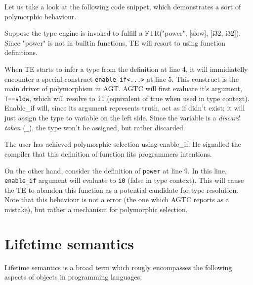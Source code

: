 \documentclass[times, utf8, diplomski]{fer}
\theoremstyle{definition}
\newcommand{\textcode}[3]{
    
}
\begin{document}
Let us take a look at the following code snippet, which demonstrates a sort of polymorphic behaviour.

\textcode{\resdir/compiler/inf1.agt}{}{a}

Suppose the type engine is invoked to fulfill a FTR("power", [slow], [i32, i32]).
Since "power" is not in builtin functions, TE will resort to using function definitions.

When TE starts to infer a type from the definition at line 4, it will immidiatelly encounter a special
construct \texttt{enable\_if<...>} at line 5. This construct is the main driver of polymorphism in AGT.
AGTC will first evaluate it's argument, \texttt{T==slow}, which will resolve to \texttt{i1} (equivalent of
true when used in type context). Enable\_if will, since its argument represents truth, act as if didn't exist;
it will just assign the type to variable on the left side. Since the variable is a \textit{discard token}
(\texttt{\_}), the type won't be assigned, but rather discarded.

The user has achieved polymorphic selection using enable\_if. He signalled the compiler that this
definition of  function fits programmers intentions.

On the other hand, consider the definition of \texttt{power} at line 9.
In this line, \texttt{enable\_if} argument will evaluate to \texttt{i0} (false in type context).
This will cause the TE to abandon this function as a potential candidate for type resolution.
Note that this behaviour is not a \critical error (the one which AGTC reports as a mistake),
but rather a mechanism for polymorphic selection.

\section{Lifetime semantics}

Lifetime semantics is a broad term which rougly encompasses the following aspects of objects
in programming languages:
\end{document}
